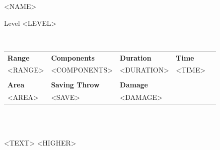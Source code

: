 \begin{figure}%
\begin{framed}

\begin{minipage}{0.5\textwidth}
    \huge
    <NAME>
\end{minipage}
\begin{minipage}{0.45\textwidth}
    \flushright
    Level <LEVEL>
\end{minipage}\\
\medskip
\phantom{0}

\begin{center}
	\begin{tabularx}{1.0\textwidth}{XXXXX}
	    \textbf{Range} & \textbf{Components} & \textbf{Duration} & \textbf{Time}\\
	    <RANGE> & <COMPONENTS> & <DURATION> & <TIME>%
	    \\	    
	    & & & \\
	    \textbf{Area} & \textbf{Saving Throw} & \textbf{Damage} & \\
	    <AREA> & <SAVE> & <DAMAGE> &
	\end{tabularx}\\
\end{center}

\phantom{0}\\
<TEXT>
<HIGHER>
\smallskip
\end{framed}
\end{figure}
